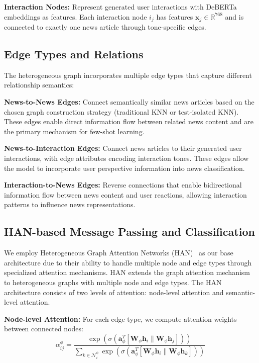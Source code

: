 \textbf{Interaction Nodes:} Represent generated user interactions with DeBERTa embeddings as features. Each interaction node $i_j$ has features $\mathbf{x}_j \in \mathbb{R}^{768}$ and is connected to exactly one news article through tone-specific edges.

\subsection{Edge Types and Relations}

The heterogeneous graph incorporates multiple edge types that capture different relationship semantics:

\textbf{News-to-News Edges:} Connect semantically similar news articles based on the chosen graph construction strategy (traditional KNN or test-isolated KNN). These edges enable direct information flow between related news content and are the primary mechanism for few-shot learning.

\textbf{News-to-Interaction Edges:} Connect news articles to their generated user interactions, with edge attributes encoding interaction tones. These edges allow the model to incorporate user perspective information into news classification.

\textbf{Interaction-to-News Edges:} Reverse connections that enable bidirectional information flow between news content and user reactions, allowing interaction patterns to influence news representations.

\subsection{HAN-based Message Passing and Classification}

We employ Heterogeneous Graph Attention Networks (HAN)~\cite{wang2019han} as our base architecture due to their ability to handle multiple node and edge types through specialized attention mechanisms. HAN extends the graph attention mechanism~\cite{veličković2018graph} to heterogeneous graphs with multiple node and edge types. The HAN architecture consists of two levels of attention: node-level attention and semantic-level attention.

\textbf{Node-level Attention:} For each edge type, we compute attention weights between connected nodes:
\begin{equation}
\alpha_{ij}^{\phi} = \frac{\exp(\sigma(\mathbf{a}_{\phi}^T[\mathbf{W}_{\phi}\mathbf{h}_i \| \mathbf{W}_{\phi}\mathbf{h}_j]))}{\sum_{k \in \mathcal{N}_i^{\phi}} \exp(\sigma(\mathbf{a}_{\phi}^T[\mathbf{W}_{\phi}\mathbf{h}_i \| \mathbf{W}_{\phi}\mathbf{h}_k]))}
\end{equation}

